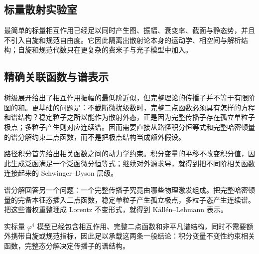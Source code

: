 \subsection{标量散射实验室}
最简单的标量相互作用已经足以同时产生图、振幅、衰变率、截面与静态势，并且不引入自旋和规范自由度。它因此隔离出散射论本身的运动学、相空间与解析结构；自旋和规范代数只在更复杂的费米子与光子模型中加入。



\subsection{精确关联函数与谱表示}\label{subsec:exact-correlators-spectral}

树级展开给出了相互作用振幅的最低阶近似，但完整理论的传播子并不等于有限阶图的和。更基础的问题是：不截断微扰级数时，完整二点函数必须具有怎样的方程和谱结构？稳定粒子之所以能作为散射外态，正是因为完整传播子存在孤立单粒子极点；多粒子产生则对应连续谱。因而需要直接从路径积分恒等式和完整哈密顿量的谱分解约束二点函数，而不是把极点结构当成额外假设。

路径积分首先给出相关函数之间的动力学约束。积分变量的平移不改变积分值，因此生成泛函满足一个泛函微分恒等式；继续对外源求导，就得到把不同阶相关函数连接起来的 Schwinger--Dyson 层级。

谱分解回答另一个问题：一个完整传播子究竟由哪些物理激发组成。把完整哈密顿量的完备本征态插入二点函数，稳定单粒子产生孤立极点，多粒子态产生连续谱。把这些谱权重整理成 Lorentz 不变形式，就得到 Källén--Lehmann 表示。

实标量 $\varphi^4$ 模型已经包含相互作用、完整二点函数和非平凡谱结构，同时不需要额外携带自旋或规范指标，因此足以承载这两条一般结论：积分变量不变性约束相关函数，完整态分解决定传播子的谱结构。




